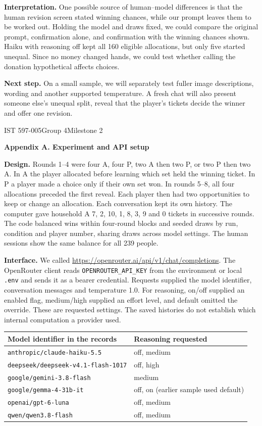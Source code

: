 \documentclass[11pt,letterpaper]{article}
\newcommand{\head}[1]{\par\vspace{1pt}\noindent\textbf{#1}\hspace{.3em}}
\newcommand{\titleline}[1]{{\LARGE\bfseries #1\par}\vspace{3pt}}
\begin{document}
\head{Interpretation.} One possible source of human--model differences is that the human revision screen stated winning chances, while our prompt leaves them to be worked out. Holding the model and draws fixed, we could compare the original prompt, confirmation alone, and confirmation with the winning chances shown. Haiku with reasoning off kept all 160 eligible allocations, but only five started unequal. Since no money changed hands, we could test whether calling the donation hypothetical affects choices.

\head{Next step.} On a small sample, we will separately test fuller image descriptions, wording and another supported temperature. A fresh chat will also present someone else's unequal split, reveal that the player's tickets decide the winner and offer one revision.

\newpage
{\small IST 597-005\quad Group 4\quad Milestone 2}\par
\titleline{Appendix A. Experiment and API setup}
\head{Design.} Rounds 1--4 were four A, four P, two A then two P, or two P then two A. In A the player allocated before learning which set held the winning ticket. In P a player made a choice only if their own set won. In rounds 5--8, all four allocations preceded the first reveal. Each player then had two opportunities to keep or change an allocation. Each conversation kept its own history. The computer gave household A 7, 2, 10, 1, 8, 3, 9 and 0 tickets in successive rounds. The code balanced wins within four-round blocks and seeded draws by run, condition and player number, sharing draws across model settings. The human sessions show the same balance for all 239 people.

\head{Interface.} We called \url{https://openrouter.ai/api/v1/chat/completions}. The OpenRouter client reads \texttt{OPENROUTER\_API\_KEY} from the environment or local \texttt{.env} and sends it as a bearer credential. Requests supplied the model identifier, conversation messages and temperature 1.0. For reasoning, on/off supplied an enabled flag, medium/high supplied an effort level, and default omitted the override. These are requested settings. The saved histories do not establish which internal computation a provider used.

{\centering\small\setlength{\tabcolsep}{8pt}\renewcommand{\arraystretch}{1.08}
\begin{tabular}{@{}ll@{}}\toprule
Model identifier in the records & Reasoning requested\\\midrule
\texttt{anthropic/claude-haiku-5.5} & off, medium\\
\texttt{deepseek/deepseek-v4.1-flash-1017} & off, high\\
\texttt{google/gemini-3.8-flash} & medium\\
\texttt{google/gemma-4-31b-it} & off, on (earlier sample used default)\\
\texttt{openai/gpt-6-luna} & off, medium\\
\texttt{qwen/qwen3.8-flash} & off, medium\\\bottomrule
\end{tabular}\par}
\end{document}
